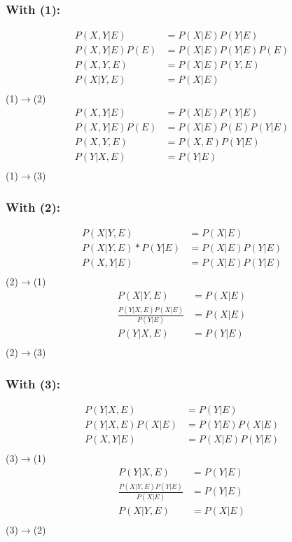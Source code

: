 \documentclass [11pt, a4paper, oneside] {article}
\begin{document}
\subsubsection *{With (1):}
\begin {align*}
P(X, Y|E) &= P(X|E)P(Y|E) \\
P(X, Y|E)P(E) &= P(X|E)P(Y|E)P(E) \\
P(X, Y, E) &= P(X|E)P(Y, E) \\
P(X|Y, E) &= P(X|E) \\
\end {align*}
(1)$\to$(2)\\
\begin {align*}
P(X, Y|E) &= P(X|E)P(Y|E) \\
P(X, Y|E)P(E) &= P(X|E)P(E)P(Y|E) \\
P(X, Y, E) &= P(X, E)P(Y|E) \\
P(Y|X, E) &= P(Y|E) \\
\end {align*}
(1)$\to$(3)\\
\subsubsection *{With (2):}
\begin {align*}
P(X|Y, E) &= P(X|E)\\
P(X|Y, E)*P(Y|E) &= P(X|E)P(Y|E) \\
P(X, Y|E) &= P(X|E)P(Y|E) \\
\end {align*}
(2)$\to$(1)\\
\begin {align*}
P(X|Y, E) &= P(X|E) \\
\frac{P(Y|X, E)P(X|E)}{P(Y|E)} &= P(X|E) \\
P(Y|X, E) &= P(Y|E)\\
\end {align*}
(2)$\to$(3)\\
\subsubsection*{With (3):}
\begin {align*}
P(Y|X, E) &= P(Y|E) \\
P(Y|X, E)P(X|E) &= P(Y|E)P(X|E) \\
P(X, Y|E) &= P(X|E)P(Y|E) \\
\end {align*}
(3)$\to$(1)\\
\begin {align*}
P(Y|X, E) &= P(Y|E) \\
\frac{P(X|Y, E)P(Y|E)}{P(X|E)} &= P(Y|E) \\
P(X|Y, E) &= P(X|E) \\
\end {align*}
(3)$\to$(2)\\
\end{document}
